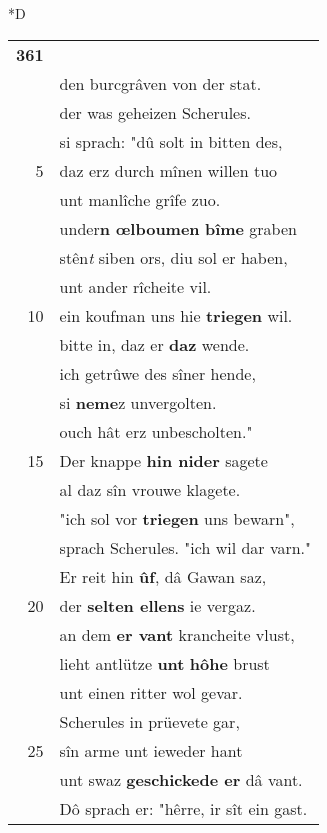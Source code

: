 \documentclass[8pt,a4paper,notitlepage]{article}
\begin{document}
\begin{table}[ht]
\begin{minipage}[t]{0.5\linewidth}
\small
\begin{center}*D
\end{center}
\begin{tabular}{rl}
\textbf{361} & \textbf{\begin{large}E\end{large}inen} junchêrren si \textbf{sprechen} bat\\ 
 & den burcgrâven von der stat.\\ 
 & der was geheizen Scherules.\\ 
 & si sprach: "dû solt in bitten des,\\ 
5 & daz erz durch mînen willen tuo\\ 
 & unt manlîche grîfe zuo.\\ 
 & under\textbf{n œlboumen} \textbf{bîme} graben\\ 
 & stên\textit{t} siben ors, diu sol er haben,\\ 
 & unt ander rîcheite vil.\\ 
10 & ein koufman uns hie \textbf{triegen} wil.\\ 
 & bitte in, daz er \textbf{daz} wende.\\ 
 & ich getrûwe des sîner hende,\\ 
 & si \textbf{neme}z unvergolten.\\ 
 & ouch hât erz unbescholten."\\ 
15 & Der knappe \textbf{hin nider} sagete\\ 
 & al daz sîn vrouwe klagete.\\ 
 & "ich sol vor \textbf{triegen} uns bewarn",\\ 
 & sprach Scherules. "ich wil dar varn."\\ 
 & Er reit hin \textbf{ûf}, dâ Gawan saz,\\ 
20 & der \textbf{selten ellens} ie vergaz.\\ 
 & an dem \textbf{er vant} krancheite vlust,\\ 
 & lieht antlütze \textbf{unt} \textbf{hôhe} brust\\ 
 & unt einen ritter wol gevar.\\ 
 & Scherules in prüevete gar,\\ 
25 & sîn arme unt ieweder hant\\ 
 & unt swaz \textbf{geschickede er} dâ vant.\\ 
 & Dô sprach er: "hêrre, ir sît ein gast.\\ 

\end{tabular}
\end{minipage}
\end{table}
\end{document}
